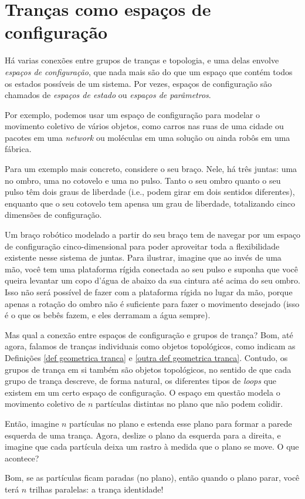 	\section{Tranças como espaços de configuração}\label{secao trancas como espacos de configuracao}
	\hspace{12pt} Há varias conexões entre grupos de tranças e topologia, e uma delas envolve \textit{espaços de configuração}, que nada mais são do que um espaço que contém todos os estados possíveis de um sistema. Por vezes, espaços de configuração são chamados de \textit{espaços de estado} ou \textit{espaços de parâmetros}.
	\par\vspace{0.3cm} Por exemplo, podemos usar um espaço de configuração para modelar o movimento coletivo de vários objetos, como carros nas ruas de uma cidade ou pacotes em uma \textit{network} ou moléculas em uma solução ou ainda robôs em uma fábrica.
	\par\vspace{0.3cm} Para um exemplo mais concreto, considere o seu braço. Nele, há três juntas: uma no ombro, uma no cotovelo e uma no pulso. Tanto o seu ombro quanto o seu pulso têm dois graus de liberdade (i.e., podem girar em dois sentidos diferentes), enquanto que o seu cotovelo tem apensa um grau de liberdade, totalizando cinco dimensões de configuração.
	\par\vspace{0.3cm} Um braço robótico modelado a partir do seu braço tem de navegar por um espaço de configuração cinco-dimensional para poder aproveitar toda a flexibilidade existente nesse sistema de juntas. Para ilustrar, imagine que ao invés de uma mão, você tem uma plataforma rígida conectada ao seu pulso e suponha que você queira levantar um copo d'água de abaixo da sua cintura até acima do seu ombro. Isso não será possível de fazer com a plataforma rígida no lugar da mão, porque apenas a rotação do ombro não é suficiente para fazer o movimento desejado (isso é o que os bebês fazem, e eles derramam a água sempre).
	\par\vspace{0.3cm} Mas qual a conexão entre espaços de configuração e grupos de trança? Bom, até agora, falamos de tranças individuais como objetos topológicos, como indicam as Definições \eqref{def geometrica tranca} e \eqref{outra def geometrica tranca}. Contudo, os grupos de trança em si também são objetos topológicos, no sentido de que cada grupo de trança descreve, de forma natural, os diferentes tipos de \textit{loops} que existem em um certo espaço de configuração. O espaço em questão modela o movimento coletivo de $n$ partículas distintas no plano que não podem colidir.
	\par\vspace{0.3cm} Então, imagine $n$ partículas no plano e estenda esse plano para formar a parede esquerda de uma trança. Agora, deslize o plano da esquerda para a direita, e imagine que cada partícula deixa um rastro à medida que o plano se move. O que acontece?
	\par\vspace{0.3cm} Bom, se as partículas ficam paradas (no plano), então quando o plano parar, você terá $n$ trilhas paralelas: a trança identidade! 
	
